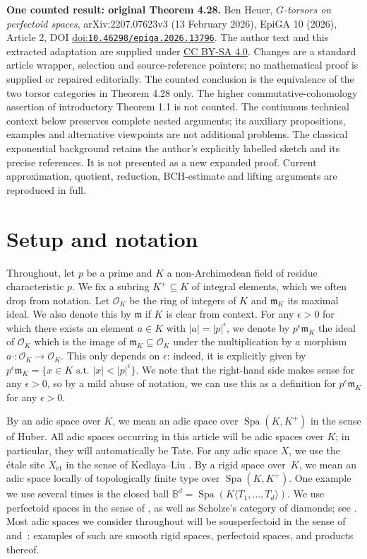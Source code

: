 \documentclass[10pt,a4paper]{article}
\newcommand{\doi}[1]{\href{https://doi.org/#1}{doi:\nolinkurl{#1}}}
\theoremstyle{definition}
\theoremstyle{remark}
\newcommand{\B}{\mathbb{B}}
\renewcommand{\O}{\mathcal{O}}
\newcommand{\Spa}{\operatorname{Spa}}
\newcommand{\et}{{\operatorname{\acute{e}t}}}
\numberwithin{equation}{section}
\begin{document}
\noindent\textbf{One counted result: original Theorem 4.28.}
Ben Heuer, \emph{$G$-torsors on perfectoid spaces}, arXiv:2207.07623v3 (13 February 2026), EpiGA 10 (2026), Article 2, DOI \doi{10.46298/epiga.2026.13796}.
The author text and this extracted adaptation are supplied under \href{https://creativecommons.org/licenses/by-sa/4.0/}{CC BY-SA 4.0}. Changes are a standard article wrapper, selection and source-reference pointers; no mathematical proof is supplied or repaired editorially.
The counted conclusion is the equivalence of the two torsor categories in Theorem 4.28 only. The higher commutative-cohomology assertion of introductory Theorem 1.1 is not counted. The continuous technical context below preserves complete nested arguments; its auxiliary propositions, examples and alternative viewpoints are not additional problems.
The classical exponential background retains the author's explicitly labelled sketch and its precise references. It is not presented as a new expanded proof. Current approximation, quotient, reduction, BCH-estimate and lifting arguments are reproduced in full.
\par\medskip

\section*{Setup and notation}
Throughout, let $p$ be a prime and $K$ a non-Archimedean field of residue characteristic $p$. We fix a subring $K^+\subseteq K$ of integral elements, which we often drop from notation. Let $\O_K$ be the ring of integers of $K$ and $\mathfrak m_K$ its maximal ideal. We also denote this by $\mathfrak m$ if $K$ is clear from context. For any $\epsilon>0$ for which there exists an element $a\in K$ with $|a|=|p|^\epsilon$, we denote by $p^\epsilon \mathfrak m_K$ the ideal of $\O_K$ which is the image of $\mathfrak m_K\subseteq \O_K$ under the multiplication by $a$ morphism $a\cdot \colon \O_K\to \O_K$.  This only depends on $\epsilon$: indeed, it is explicitly given by
$p^\epsilon\mathfrak m_K=\{x\in K \text{ s.t.\ }|x|<|p|^{\epsilon}\}$. We note that the right-hand side makes sense for any $\epsilon>0$, so by a mild abuse of notation, we can use this as a definition for $p^\epsilon\mathfrak m_K$ for any $\epsilon>0$.

 By an adic space over $K$, we mean an adic space over $\Spa(K,K^+)$ in the sense of Huber. All adic spaces occurring in this article will be adic spaces over $K$; in particular, they will automatically be Tate.
  For any adic space $X$, we use the \'etale site $X_{\et}$ in the sense of Kedlaya--Liu \cite[Definition 8.2.16]{KedlayaLiu-rel-p-p-adic-Hodge-I}.
By a rigid space over~$K$, we mean an adic space locally of topologically finite type over $\Spa(K,K^+)$. One example we use several times is the closed ball $\B^d=\Spa(K\langle T_1,\dots,T_d\rangle)$. We use perfectoid spaces in the sense of \cite{perfectoid-spaces}, as well as Scholze's category of diamonds; see  \cite{etale-cohomology-of-diamonds}.
Most adic spaces we consider throughout will be sousperfectoid in the sense of \cite[Section~6.3]{ScholzeBerkeleyLectureNotes} and~\cite{HK_sheafiness}: examples of such are smooth rigid spaces, perfectoid spaces, and products thereof. 
\end{document}
